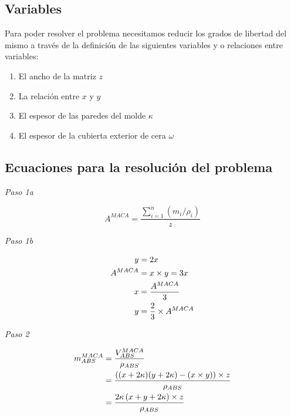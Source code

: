 \documentclass[
]{book}
\providecommand{\tightlist}{%
  \setlength{\itemsep}{0pt}\setlength{\parskip}{0pt}}
\begin{document}
\hypertarget{variables}{%
\subsection{Variables}\label{variables}}

Para poder resolver el problema necesitamos reducir los grados de libertad del
mismo a través de la definición de las siguientes variables y o relaciones
entre variables:

\begin{enumerate}
\def\labelenumi{\alph{enumi}.}
\tightlist
\item
  El ancho de la matriz \(z\)
\item
  La relación entre \(x\) y \(y\)
\item
  El espesor de las paredes del molde \(\kappa\)
\item
  El espesor de la cubierta exterior de cera \(\omega\)
\end{enumerate}

\hypertarget{ecuaciones-para-la-resoluciuxf3n-del-problema}{%
\subsection{Ecuaciones para la resolución del problema}\label{ecuaciones-para-la-resoluciuxf3n-del-problema}}

\emph{Paso 1a}

\begin{equation}
A^{MACA}=\frac{\sum_{i=1}^n\left(m_i / \rho_i \right)}{z}
\end{equation}

\emph{Paso 1b}

\begin{align}
y &= 2x \notag \\
A^{MACA} &= x \times y = 3x \notag \\
x &= \frac{A^{MACA}}{3} \notag \\
y &= \frac{2}{3} \times A^{MACA} \notag
\end{align}

\emph{Paso 2}

\begin{align}
m_{ABS}^{MACA} & = \frac{V_{ABS}^{MACA}}{\rho_{ABS}} \notag \\
& = \frac{\left((x+2\kappa)(y+2\kappa) - (x \times y) \right) \times z}
{\rho_{ABS}} \notag \\
& = \frac{2\kappa\left(x+y+2\kappa \right) \times z}{\rho_{ABS}}
\end{align}
\end{document}
